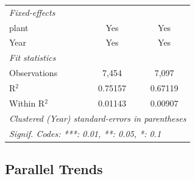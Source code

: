 \documentclass[
  12pt]{article}
\theoremstyle{definition}
\theoremstyle{remark}
\begin{document}
\begin{table}
\begin{minipage}{\linewidth}
\begin{tabular}{lcc}
   \midrule
   \emph{Fixed-effects}\\
   plant                                                   & Yes                    & Yes\\  
   Year                                                    & Yes                    & Yes\\  
   \midrule
   \emph{Fit statistics}\\
   Observations                                            & 7,454                  & 7,097\\  
   R$^2$                                                   & 0.75157                & 0.67119\\  
   Within R$^2$                                            & 0.01143                & 0.00907\\  
   \midrule \midrule
   \multicolumn{3}{l}{\emph{Clustered (Year) standard-errors in parentheses}}\\
   \multicolumn{3}{l}{\emph{Signif. Codes: ***: 0.01, **: 0.05, *: 0.1}}\\
\end{tabular}
\par\endgroup

\end{minipage}%

\end{table}%

\subsection{Parallel Trends}\label{parallel-trends}
\end{document}
